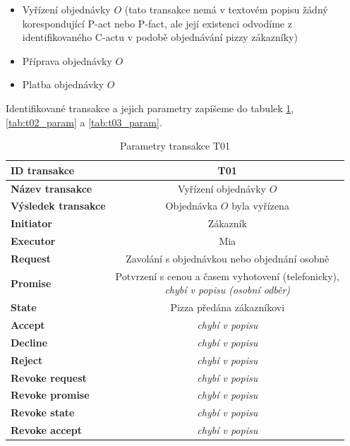 \begin{itemize}
\item Vyřízení objednávky $O$ (tato transakce nemá v textovém popisu žádný korespondující P-act nebo P-fact, ale její existenci odvodíme z identifikovaného C-actu v podobě objednávání pizzy zákazníky)
\item Příprava objednávky $O$ 
\item Platba objednávky $O$ 
\end{itemize}

Identifikované transakce a jejich parametry zapíšeme do tabulek \ref{tab:t01_param}, \ref{tab:t02_param} a \ref{tab:t03_param}.

\begin{table} [H] \centering
\begin{tabular}{|>{\bfseries} l| | c |}
\hline
  ID transakce & T01 \\
\hline
  Název transakce & Vyřízení objednávky $O$  \\
\hline
  Výsledek transakce & Objednávka $O$ byla vyřízena \\
\hline
  Initiator & Zákazník \\
\hline
  Executor & Mia \\
\hline
\hline
  Request & Zavolání s objednávkou nebo objednání osobně \\
\hline
  Promise & \makecell{Potvrzení s cenou a časem vyhotovení (telefonicky), \\ \textit{chybí v popisu (osobní odběr)}}\\
\hline
  State & Pizza předána zákazníkovi \\
\hline
  Accept & \textit{chybí v popisu} \\
\hline
\hline
  Decline &  \textit{chybí v popisu} \\
\hline
  Reject & \textit{chybí v popisu} \\
\hline
\hline
  Revoke request & \textit{chybí v popisu} \\
\hline
  Revoke promise & \textit{chybí v popisu} \\
\hline
  Revoke state & \textit{chybí v popisu} \\
\hline
  Revoke accept & \textit{chybí v popisu} \\
\hline
\end{tabular}
\caption{Parametry transakce T01}
\label{tab:t01_param}
\end{table}

